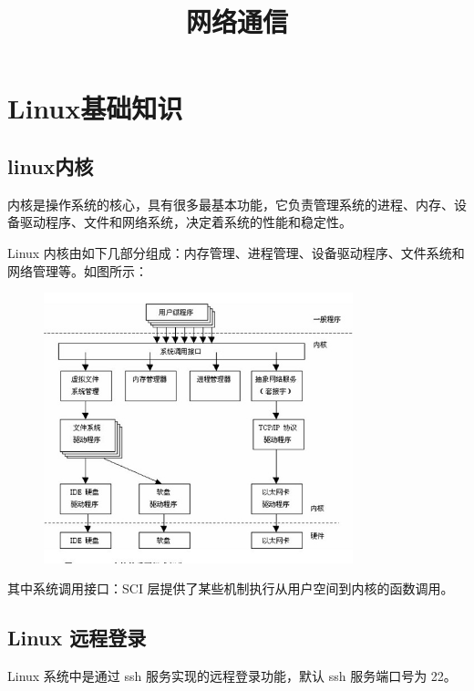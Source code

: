 \documentclass[UTF8]{article}%
\begin{document}


\title{网络通信}%
\maketitle%

\section{Linux基础知识}

\subsection{linux内核}

内核是操作系统的核心，具有很多最基本功能，它负责管理系统的进程、内存、设备驱动程序、文件和网络系统，决定着系统的性能和稳定性。

Linux 内核由如下几部分组成：内存管理、进程管理、设备驱动程序、文件系统和网络管理等。如图所示：

\begin{figure}[htb!]%
    \includegraphics[width=0.8\textwidth]{1.1-1.jpg}
\end{figure}

其中系统调用接口：SCI 层提供了某些机制执行从用户空间到内核的函数调用。

\subsection{Linux 远程登录}

Linux 系统中是通过 ssh 服务实现的远程登录功能，默认 ssh 服务端口号为 22。
\end{document}
